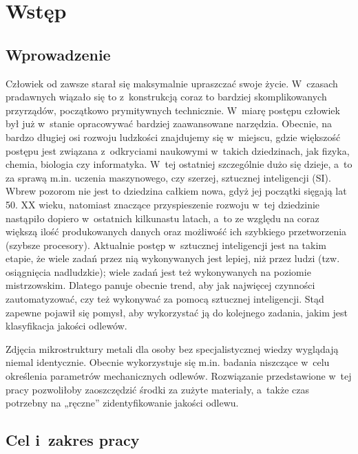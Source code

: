 \chapter{Wstęp}
\label{cha:wstep}

\section{Wprowadzenie}
\label{sec:wprowadzenie}

Człowiek od zawsze starał się maksymalnie upraszczać swoje życie. W~czasach pradawnych wiązało się to z~konstrukcją coraz to bardziej skomplikowanych przyrządów, początkowo prymitywnych technicznie. W~miarę postępu człowiek był już w~stanie opracowywać bardziej zaawansowane narzędzia. Obecnie, na bardzo długiej osi rozwoju ludzkości znajdujemy się w~miejscu, gdzie większość postępu jest związana z~odkryciami naukowymi w~takich dziedzinach, jak fizyka, chemia, biologia czy informatyka. W~tej ostatniej szczególnie dużo się dzieje, a~to za sprawą m.in. uczenia maszynowego, czy szerzej, sztucznej inteligencji (SI). Wbrew pozorom nie jest to dziedzina całkiem nowa, gdyż jej początki sięgają lat 50. XX wieku, natomiast znaczące przyspieszenie rozwoju w~tej dziedzinie nastąpiło dopiero w~ostatnich kilkunastu latach, a~to ze względu na coraz większą ilość produkowanych danych oraz możliwość ich szybkiego przetworzenia (szybsze procesory). Aktualnie postęp w~sztucznej inteligencji jest na takim etapie, że wiele zadań przez nią wykonywanych jest lepiej, niż przez ludzi (tzw. osiągnięcia nadludzkie); wiele zadań jest też wykonywanych na poziomie mistrzowskim. Dlatego panuje obecnie trend, aby jak najwięcej czynności zautomatyzować, czy też wykonywać za pomocą sztucznej inteligencji. Stąd zapewne pojawił się pomysł, aby wykorzystać ją do kolejnego zadania, jakim jest klasyfikacja jakości odlewów.

Zdjęcia mikrostruktury metali dla osoby bez specjalistycznej wiedzy wyglądają niemal identycznie. Obecnie wykorzystuje się m.in. badania niszczące w~celu określenia parametrów mechanicznych odlewów. Rozwiązanie przedstawione w~tej pracy pozwoliłoby zaoszczędzić środki za zużyte materiały, a~także czas potrzebny na „ręczne” zidentyfikowanie jakości odlewu.

\section{Cel i~zakres pracy}
\label{sec:cel}

